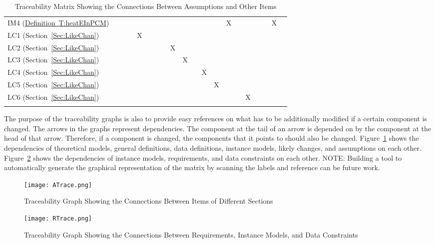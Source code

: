 \documentclass[12pt]{article}
\begin{document}
\begin{longtable}{l l l l l l l l l l l l l l l l l l l l}
IM4 (\hyperref[T:heatEInPCM]{Definition~T:heatEInPCM}) &  &  &  &  &  &  &  &  &  &  &  &  & X &  &  &  &  & X & 
\\
LC1 (Section~\ref{Sec:LikeChan}) &  &  &  & X &  &  &  &  &  &  &  &  &  &  &  &  &  &  & 
\\
LC2 (Section~\ref{Sec:LikeChan}) &  &  &  &  &  &  &  & X &  &  &  &  &  &  &  &  &  &  & 
\\
LC3 (Section~\ref{Sec:LikeChan}) &  &  &  &  &  &  &  &  & X &  &  &  &  &  &  &  &  &  & 
\\
LC4 (Section~\ref{Sec:LikeChan}) &  &  &  &  &  &  &  &  &  &  & X &  &  &  &  &  &  &  & 
\\
LC5 (Section~\ref{Sec:LikeChan}) &  &  &  &  &  &  &  &  &  &  &  & X &  &  &  &  &  &  & 
\\
LC6 (Section~\ref{Sec:LikeChan}) &  &  &  &  &  &  &  &  &  &  &  &  &  &  & X &  &  &  & 
\\
\bottomrule
\caption{Traceability Matrix Showing the Connections Between Assumptions and Other Items}
\label{Table:TracMatrShowtheConnBetwAssuandOtheItem}
\end{longtable}
The purpose of the traceability graphs is also to provide easy references on what has to be additionally modified if a certain component is changed. The arrows in the graphs represent dependencies. The component at the tail of an arrow is depended on by the component at the head of that arrow. Therefore, if a component is changed, the components that it points to should also be changed. Figure~\ref{Figure:TracGrapShowtheConnBetwItemofDiffSect} shows the dependencies of theoretical models, general definitions, data definitions, instance models, likely changes, and assumptions on each other. Figure~\ref{Figure:TracGrapShowtheConnBetwRequInstModeandDataCons} shows the dependencies of instance models, requirements, and data constraints on each other.
NOTE: Building a tool to automatically generate the graphical representation of the matrix by scanning the labels and reference can be future work.
\begin{figure}
\begin{center}
\texttt{[image: ATrace.png]}
\caption{Traceability Graph Showing the Connections Between Items of Different Sections}
\label{Figure:TracGrapShowtheConnBetwItemofDiffSect}
\end{center}
\end{figure}
\begin{figure}
\begin{center}
\texttt{[image: RTrace.png]}
\caption{Traceability Graph Showing the Connections Between Requirements, Instance Models, and Data Constraints}
\label{Figure:TracGrapShowtheConnBetwRequInstModeandDataCons}
\end{center}
\end{figure}
\end{document}

